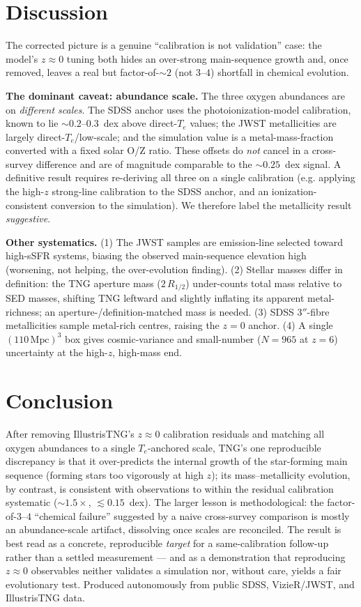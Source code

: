 \documentclass[twocolumn]{aastex631}
\begin{document}
\section{Discussion}
The corrected picture is a genuine ``calibration is not validation'' case: the model's $z\approx0$ tuning both hides an over-strong main-sequence growth and, once removed, leaves a real but factor-of-$\sim2$ (not $3$--$4$) shortfall in chemical evolution.

\textbf{The dominant caveat: abundance scale.} The three oxygen abundances are on \emph{different scales}. The SDSS anchor uses the \citet{tremonti04} photoionization-model calibration, known to lie $\sim0.2$--$0.3$~dex above direct-$T_e$ values; the JWST metallicities are largely direct-$T_e$/low-scale; and the simulation value is a metal-mass-fraction converted with a fixed solar O/Z ratio. These offsets do \emph{not} cancel in a cross-survey difference and are of magnitude comparable to the $\sim0.25$~dex signal. A definitive result requires re-deriving all three on a single calibration (e.g. applying the high-$z$ strong-line calibration to the SDSS anchor, and an ionization-consistent conversion to the simulation). We therefore label the metallicity result \emph{suggestive}.

\textbf{Other systematics.} (1) The JWST samples are emission-line selected toward high-sSFR systems, biasing the observed main-sequence elevation high (worsening, not helping, the over-evolution finding). (2) Stellar masses differ in definition: the TNG aperture mass ($2\,R_{1/2}$) under-counts total mass relative to SED masses, shifting TNG leftward and slightly inflating its apparent metal-richness; an aperture-/definition-matched mass is needed. (3) SDSS $3''$-fibre metallicities sample metal-rich centres, raising the $z=0$ anchor. (4) A single $(110\,\mathrm{Mpc})^3$ box gives cosmic-variance and small-number ($N=965$ at $z=6$) uncertainty at the high-$z$, high-mass end.

\section{Conclusion}
After removing IllustrisTNG's $z\approx0$ calibration residuals and matching all oxygen abundances to a single $T_e$-anchored scale, TNG's one reproducible discrepancy is that it over-predicts the internal growth of the star-forming main sequence (forming stars too vigorously at high $z$); its mass--metallicity evolution, by contrast, is consistent with observations to within the residual calibration systematic ($\sim1.5\times$, $\lesssim0.15$~dex). The larger lesson is methodological: the factor-of-$3$--$4$ ``chemical failure'' suggested by a naive cross-survey comparison is mostly an abundance-scale artifact, dissolving once scales are reconciled. The result is best read as a concrete, reproducible \emph{target} for a same-calibration follow-up rather than a settled measurement --- and as a demonstration that reproducing $z\approx0$ observables neither validates a simulation nor, without care, yields a fair evolutionary test. Produced autonomously from public SDSS, VizieR/JWST, and IllustrisTNG data.
\end{document}

